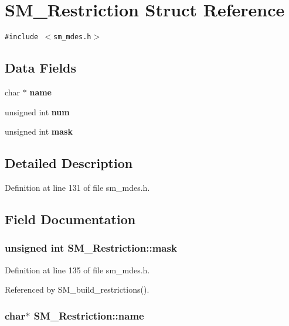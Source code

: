 \section{SM\_\-Restriction Struct Reference}
\label{structSM__Restriction}
{\tt \#include $<$sm\_\-mdes.h$>$}

\subsection*{Data Fields}
\begin{CompactItemize}
\item 
char $\ast$ \bf{name}
\item 
unsigned int \bf{num}
\item 
unsigned int \bf{mask}
\end{CompactItemize}


\subsection{Detailed Description}




Definition at line 131 of file sm\_\-mdes.h.

\subsection{Field Documentation}
\subsubsection{\setlength{\rightskip}{0pt plus 5cm}unsigned int \bf{SM\_\-Restriction::mask}}\label{structSM__Restriction_116441544c01df94f51659922ea3b69b}




Definition at line 135 of file sm\_\-mdes.h.

Referenced by SM\_\-build\_\-restrictions().
\subsubsection{\setlength{\rightskip}{0pt plus 5cm}char$\ast$ \bf{SM\_\-Restriction::name}}\label{structSM__Restriction_074017ef29881a1b727977d865c9a4e0}




